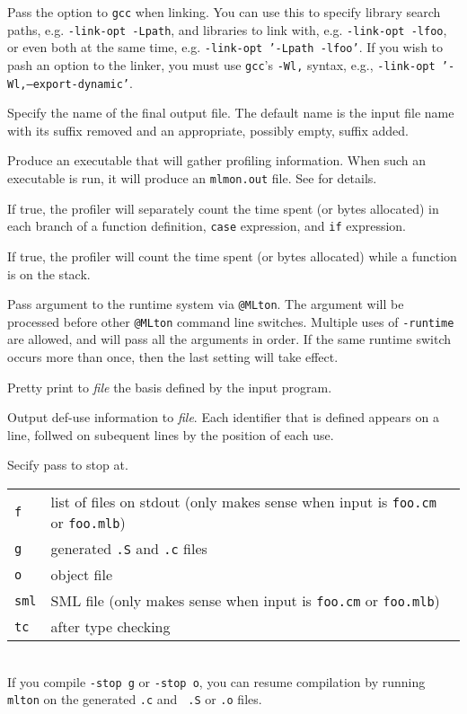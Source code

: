 \begin{description}
Pass the option to {\tt gcc} when linking.  You can use this to
specify library search paths, e.g. {\tt -link-opt -Lpath}, and
libraries to link with, e.g. {\tt -link-opt -lfoo}, or even both at
the same time, e.g. {\tt -link-opt '-Lpath -lfoo'}.  If you wish to
pash an option to the linker, you must use {\tt gcc}'s {\tt -Wl,}
syntax, e.g., {\tt -link-opt '-Wl,--export-dynamic'}.

Specify the name of the final output file. The default name is the
input file name with its suffix removed and an appropriate, possibly
empty, suffix added.

Produce an executable that will gather profiling information.  When
such an executable is run, it will produce an {\tt mlmon.out} file.
See  for details.

If true, the profiler will separately count the time spent (or bytes
allocated) in each branch of a function definition, {\tt case}
expression, and {\tt if} expression.

If true, the profiler will count the time spent (or bytes allocated)
while a function is on the stack.

Pass argument to the runtime system via {\tt @MLton}.  The argument
will be processed before other {\tt @MLton} command line switches.
Multiple uses of {\tt -runtime} are allowed, and will pass all the
arguments in order.  If the same runtime switch occurs more than once,
then the last setting will take effect.

Pretty print to {\it file} the basis defined by the input program.

Output def-use information to {\it file}.  Each identifier that is
defined appears on a line, follwed on subequent lines by the position
of each use.

Secify pass to stop at.\\
\hspace*{0.5in}
\begin{tabular}{l|l}
\hline
{\tt f} & list of files on stdout (only makes sense when input is {\tt foo.cm} or {\tt foo.mlb})\\
{\tt g} & generated {\tt .S} and {\tt .c} files\\
{\tt o} & object file\\
{\tt sml} & SML file (only makes sense when input is {\tt foo.cm} or {\tt foo.mlb})\\
{\tt tc} & after type checking\\
\end{tabular}\\
If you compile {\tt -stop g} or {\tt -stop o}, you can resume
compilation by running {\tt mlton} on the generated {\tt .c} and {\tt
.S} or {\tt .o} files. 


\end{description}
